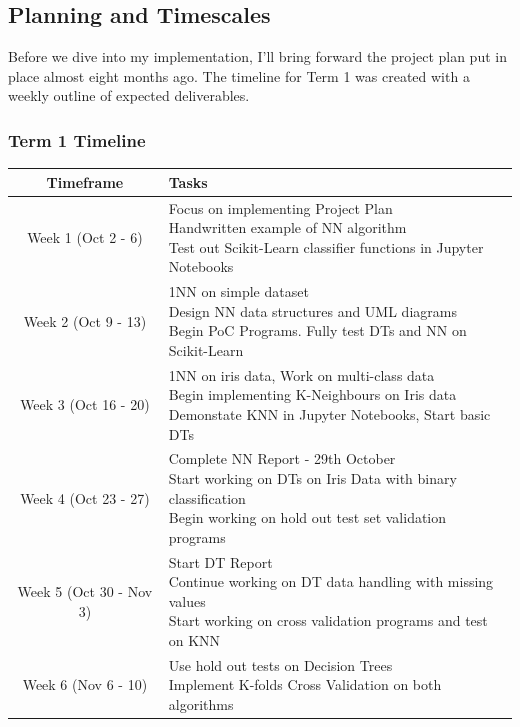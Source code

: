 \documentclass[letterpaper,10pt]{article}
\begin{document}
\newpage
\subsection{Planning and Timescales} \label{plan}
Before we dive into my implementation, I'll bring forward the project plan put in place almost eight months ago. The timeline for Term 1 was created with a weekly outline of expected deliverables. \par
\subsubsection{Term 1 Timeline}
\begin{tabular}{|c|p{10cm}|}
\hline
Timeframe & Tasks \\
\hline
Week 1 (Oct 2 - 6) & 
\makecell[l]{Focus on implementing Project Plan \\
Handwritten example of NN algorithm \\
Test out Scikit-Learn classifier functions in Jupyter Notebooks } \\
\hline
Week 2 (Oct 9 - 13) & 
\makecell[l]{1NN on simple dataset \\
Design NN data structures and UML diagrams \\
Begin PoC Programs. Fully test DTs and NN on Scikit-Learn} \\
\hline
Week 3 (Oct 16 - 20) & 
\makecell[l]{1NN on iris data, Work on multi-class data \\
Begin implementing K-Neighbours on Iris data \\
Demonstate KNN in Jupyter Notebooks, Start basic DTs} \\
\hline
Week 4 (Oct 23 - 27) & 
\makecell[l]{Complete NN Report - 29th October \\
Start working on DTs on Iris Data with binary classification \\
Begin working on hold out test set validation programs} \\
\hline
Week 5 (Oct 30 - Nov 3) & 
\makecell[l]{Start DT Report \\
Continue working on DT data handling with missing values \\
Start working on cross validation programs and test on KNN} \\
\hline
Week 6 (Nov 6 - 10) & 
\makecell[l]{Use hold out tests on Decision Trees \\
 Implement K-folds Cross Validation on both algorithms \\
}
\end{tabular}
\end{document}

